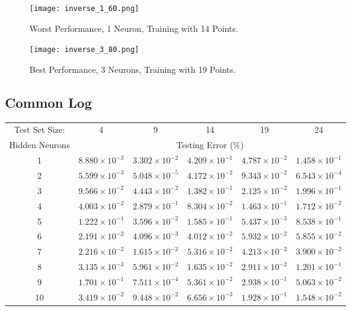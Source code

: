 \documentclass{article}
\begin{document}
		\begin{figure}[!ht]
			\texttt{[image: inverse\_1\_60.png]}
			\caption{Worst Performance, 1 Neuron, Training with 14 Points.}
			\label{F_I_1}
		\end{figure}
		\begin{figure}[!ht]
			\texttt{[image: inverse\_3\_80.png]}
			\caption{Best Performance, 3 Neurons, Training with 19 Points.}
			\label{F_I_2}
		\end{figure}
\pagebreak
	\subsection{Common Log}
		\begin{minipage}{\linewidth}
			\centering
			\begin{tabular}{c|ccccc}\label{T2}
				Test Set Size:  & 4 & 9 & 14 & 19 & 24 \\
				Hidden Neurons  & \multicolumn{5}{c}{Testing Error (\%)} \\
				\hline\noalign{\smallskip}
				1	& $8.880\times 10^{-3}$	& $3.302\times 10^{-2}$ & $4.209\times 10^{-1}$ & $4.787\times 10^{-2}$ & $1.458\times 10^{-1}$ \\
				2	& $5.599\times 10^{-3}$	& $5.048\times 10^{-5}$ & $4.172\times 10^{-2}$ & $9.343\times 10^{-2}$ & $6.543\times 10^{-4}$ \\
				3	& $9.566\times 10^{-2}$	& $4.443\times 10^{-2}$ & $1.382\times 10^{-1}$ & $2.125\times 10^{-2}$ & $1.996\times 10^{-1}$ \\
				4	& $4.003\times 10^{-2}$	& $2.879\times 10^{-1}$ & $8.304\times 10^{-2}$ & $1.463\times 10^{-1}$ & $1.712\times 10^{-2}$ \\
				5	& $1.222\times 10^{-1}$	& $3.596\times 10^{-2}$ & $1.585\times 10^{-1}$ & $5.437\times 10^{-3}$ & $8.538\times 10^{-1}$ \\
				6	& $2.191\times 10^{-2}$	& $4.096\times 10^{-3}$ & $4.012\times 10^{-2}$ & $5.932\times 10^{-2}$ & $5.855\times 10^{-2}$ \\
				7	& $2.216\times 10^{-2}$	& $1.615\times 10^{-2}$ & $5.316\times 10^{-2}$ & $4.213\times 10^{-2}$ & $3.900\times 10^{-2}$ \\
				8	& $3.135\times 10^{-3}$	& $5.961\times 10^{-2}$ & $1.635\times 10^{-2}$ & $2.911\times 10^{-2}$ & $1.201\times 10^{-1}$ \\
				9	& $1.701\times 10^{-1}$	& $7.511\times 10^{-4}$ & $5.361\times 10^{-2}$ & $2.938\times 10^{-1}$ & $5.063\times 10^{-2}$ \\
				10	& $3.419\times 10^{-2}$	& $9.448\times 10^{-2}$ & $6.656\times 10^{-3}$ & $1.928\times 10^{-1}$ & $1.548\times 10^{-2}$ \\
			\end{tabular}
		\end{minipage}
	
\end{document}
